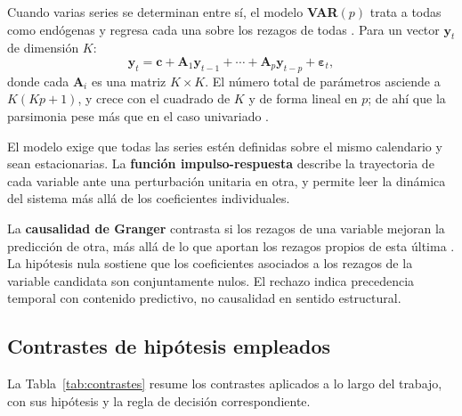 Cuando varias series se determinan entre sí, el modelo \textbf{VAR$(p)$} trata a
todas como endógenas y regresa cada una sobre los rezagos de todas \parencite{sims1980}. Para
un vector $\mathbf{y}_t$ de dimensión $K$:
\begin{equation}
\mathbf{y}_t = \mathbf{c} + \mathbf{A}_1 \mathbf{y}_{t-1} + \cdots + \mathbf{A}_p \mathbf{y}_{t-p} + \boldsymbol{\varepsilon}_t,
\end{equation}
donde cada $\mathbf{A}_i$ es una matriz $K \times K$. El número total de parámetros asciende a $K(Kp+1)$, y crece con el cuadrado de $K$ y de forma
lineal en $p$; de ahí que la parsimonia pese más que en el caso univariado \parencite{sims1980}.

El modelo exige que todas las series estén definidas sobre el mismo calendario y sean
estacionarias. La \textbf{función impulso-respuesta} describe la trayectoria de cada variable
ante una perturbación unitaria en otra, y permite leer la dinámica del sistema más allá de los
coeficientes individuales.

La \textbf{causalidad de Granger} contrasta si los rezagos de una variable mejoran la
predicción de otra, más allá de lo que aportan los rezagos propios de esta última
\parencite{granger1969}. La hipótesis nula sostiene que los coeficientes asociados a los
rezagos de la variable candidata son conjuntamente nulos. El rechazo indica precedencia temporal con contenido predictivo, no causalidad en sentido
estructural.

\subsection{Contrastes de hipótesis empleados}

La Tabla~\ref{tab:contrastes} resume los contrastes aplicados a lo largo del trabajo, con sus
hipótesis y la regla de decisión correspondiente.

